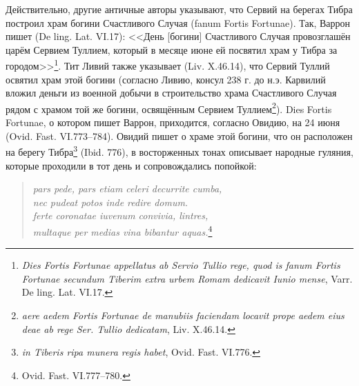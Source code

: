 
Действительно, другие античные авторы указывают, что Сервий на берегах Тибра построил храм богини Счастливого Случая (fanum Fortis Fortunae). Так, Варрон пишет (De ling. Lat. VI.17): <<День [богини] Счастливого Случая провозглашён царём Сервием Туллием, который в месяце июне ей посвятил храм у Тибра за городом>>\footnote{\textit{Dies Fortis Fortunae appellatus ab Servio Tullio rege, quod is fanum Fortis Fortunae secundum Tiberim extra urbem Romam dedicavit Iunio mense}, Varr. De ling. Lat. VI.17.}. Тит Ливий также указывает (Liv. X.46.14), что Сервий Туллий освятил храм этой богини (согласно Ливию, консул 238 г. до н.э. Карвилий вложил деньги из военной добычи в строительство храма Счастливого Случая рядом с храмом той же богини, освящённым Сервием Туллием\footnote{\textit{aere aedem Fortis Fortunae de manubiis faciendam locavit prope aedem eius deae ab rege Ser. Tullio dedicatam}, Liv. X.46.14.}). Dies Fortis Fortunae, о котором пишет Варрон, приходится, согласно Овидию, на 24 июня (Ovid. Fast. VI.773--784). Овидий пишет о храме этой богини, что он расположен на берегу Тибра\footnote{\textit{in Tiberis ripa munera regis habet}, Ovid. Fast. VI.776.} (Ibid. 776), в восторженных тонах описывает народные гуляния, которые проходили в тот день и сопровождались попойкой:

\begin{verse}
\textit{pars pede, pars etiam celeri decurrite cumba,\\
nec pudeat potos inde redire domum.\\
ferte coronatae iuvenum convivia, lintres,\\
multaque per medias vina bibantur aquas.}\footnote{Ovid. Fast. VI.777--780.}
\end{verse}

